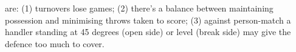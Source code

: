 \documentclass{tufte-handout}
\begin{document}




 are: (1) turnovers lose games; 
(2) there's a balance between maintaining possession and minimising throws taken to score; 
(3) against person-match a handler standing at 45 degrees (open side) or level (break side) 
may give the defence too much to cover. 
\end{document}
